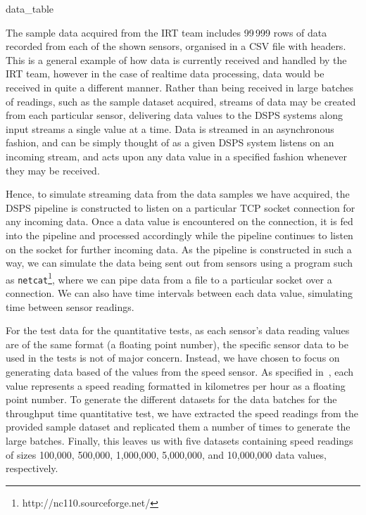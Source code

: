 {data_table}

The sample data acquired from the IRT team includes 99\,999 rows of data recorded from each of the shown sensors,
organised in a CSV file with headers. This is a general example of how data is currently received and handled by the IRT
team, however in the case of realtime data processing, data would be received in quite a different manner. Rather than
being received in large batches of readings, such as the sample dataset acquired, streams of data may be created from
each particular sensor, delivering data values to the DSPS systems along input streams a single value at a time. Data
is streamed in an asynchronous fashion, and can be simply thought of as a given DSPS system listens on an incoming stream, and
acts upon any data value in a specified fashion whenever they may be received.

Hence, to simulate streaming data from the data samples we have acquired, the DSPS pipeline is constructed to listen on
a particular TCP socket connection for any incoming data. Once a data value is encountered on the connection, it is fed into
the pipeline and processed accordingly while the pipeline continues to listen on the socket for further incoming data.
As the pipeline is constructed in such a way, we can simulate the data being sent out from sensors using a program such
as \texttt{netcat}\footnote{http://nc110.sourceforge.net/}, where we can pipe data from a file to a particular
socket over a connection. We can also have time intervals between each data value, simulating time between sensor readings.

For the test data for the quantitative tests, as each sensor's data reading values are of the same format (a floating point
number), the specific sensor data to be used in the tests is not of major concern. Instead, we have chosen to focus on
generating data based of the values from the speed sensor. As specified in~, each value represents
a speed reading formatted in kilometres per hour as a floating point number. To generate the different datasets for the
data batches for the throughput time quantitative test, we have extracted the speed readings from the provided sample dataset
and replicated them a number of times to generate the large batches. Finally, this leaves us with five datasets containing
speed readings of sizes 100,\@000, 500,\@000, 1,\@000,\@000, 5,\@000,\@000, and 10,\@000,\@000 data values, respectively.



